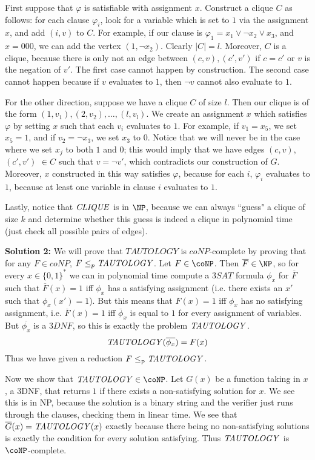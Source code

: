 \documentclass[10pt]{article}
\newcommand{\pred}{\leq_\text{p}}
\newcommand{\TSAT}{3\mathit{SAT}}
\begin{document}
First suppose that $\varphi$ is satisfiable with assignment $x$. Construct a clique $C$ as follows: for each clause $\varphi_i$, look for a variable which is set to $1$ via the assignment $x$, and add $(i,v)$ to $C$. For example, if our clause is $\varphi_1=x_1 \lor \lnot x_2 \lor x_3$, and $x=000$, we can add the vertex $(1,\lnot x_2)$. Clearly $|C|=l$. Moreover, $C$ is a clique, because there is only not an edge between $(c,v),(c',v')$ if $c=c'$ or $v$ is the negation of $v'$. The first case cannot happen by construction. The second case cannot happen because if $v$ evaluates to $1$, then $\lnot v$ cannot also evaluate to $1$.\par

For the other direction, suppose we have a clique $C$ of size $l$. Then our clique is of the form $(1,v_1),(2,v_2),\dots,(l,v_l)$. We create an assignment $x$ which satisfies $\varphi$ by setting $x$ such that each $v_i$ evaluates to $1$. For example, if $v_1=x_5$, we set $x_5=1$, and if $v_2=\lnot x_3$, we set $x_3$ to $0$. Notice that we will never be in the case where we set $x_j$ to both $1$ and $0$; this would imply that we have edges $(c,v)$, $(c',v')$ $\in C$ such that $v = \lnot v'$, which contradicts our construction of $G$. Moreover, $x$ constructed in this way satisfies $\varphi$, because for each $i$, $\varphi_i$ evaluates to $1$, because at least one variable in clause $i$ evaluates to $1$.\par

Lastly, notice that $\mathit{CLIQUE}$ is in $\NP$, because we can always ``guess" a clique of size $k$ and determine whether this guess is indeed a clique in polynomial time (just check all possible pairs of edges).

\textbf{Solution 2:} We will prove that $TAUTOLOGY$ is $coNP$-complete by proving that for any $F\in coNP$, $F \leq_p \mathit{TAUTOLOGY}$. Let $F \in \coNP$. Then $\overline{F} \in \NP$, so for every $x \in \{0,1\}^{*}$ we can in polynomial time compute a $\TSAT$ formula $\phi_{x}$ for $\overline{F}$ such that $\overline{F}(x)=1$ iff $\phi_{x}$ has a satisfying assignment (i.e. there exists an $x'$ such that $\phi_{x}(x')=1$). But this means that $F(x)=1$ iff $\phi_{x}$ has no satisfying assignment, i.e. $\overline{F}(x)=1$ iff $\overline\phi_{x}$ is equal to $1$ for every assignment of variables. But $\overline{\phi_x}$ is a $3DNF$, so this is exactly the problem $\mathit{TAUTOLOGY}$.
$$\mathit{TAUTOLOGY}(\overline{\phi_x}) = F(x)$$
Thus we have given a reduction $F \pred \TAUT$.

Now we show that $\TAUT\in \coNP$. Let $G(x)$ be a function taking in $x$, a 3DNF, that returns $1$ if there exists a non-satisfying solution for $x$. We see this is in NP, because the solution is a binary string and the verifier just runs through the clauses, checking them in linear time. We see that $\overline{G}(x) = \mathit{TAUTOLOGY}(x)$ exactly because there being no non-satisfying solutions is exactly the condition for every solution satisfying. Thus $\mathit{TAUTOLOGY}$ is $\coNP$-complete.
\end{document}

